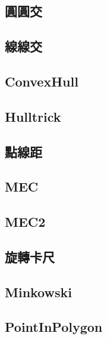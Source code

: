 \documentclass[a4paper,10pt,twocolumn,oneside]{article}
\begin{document}
    \subsection{圓圓交}
    

    \subsection{線線交}
    

    \subsection{ConvexHull}
    

    \subsection{Hulltrick}
    

    \subsection{點線距}
    

    \subsection{MEC}
    

    \subsection{MEC2}
    

    \subsection{旋轉卡尺}
    
    
    \subsection{Minkowski}
    

    \subsection{PointInPolygon}
    
\end{document}
